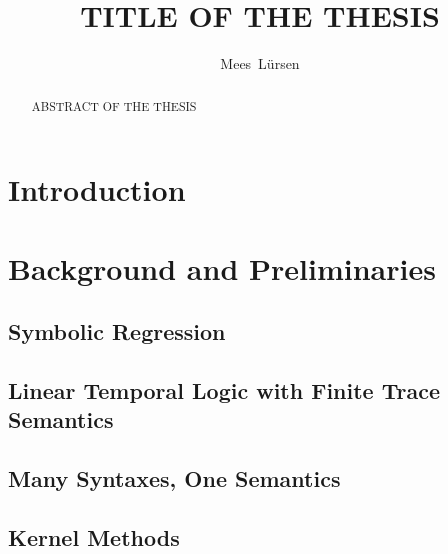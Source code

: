 \documentclass[titlepage,a4paper,11pt]{report}
\begin{document}
\title{TITLE OF THE THESIS}
\author{Mees~Lürsen}
\maketitle

\begin{abstract}
  ABSTRACT OF THE THESIS

\end{abstract}


\clearpage

\tableofcontents

\chapter{Introduction}


\chapter{Background and Preliminaries}
    \section{Symbolic Regression}

    \section{Linear Temporal Logic with Finite Trace Semantics}
    
    \section{Many Syntaxes, One Semantics}

    \section{Kernel Methods}\label{sec:kernel_methods}
\end{document}
